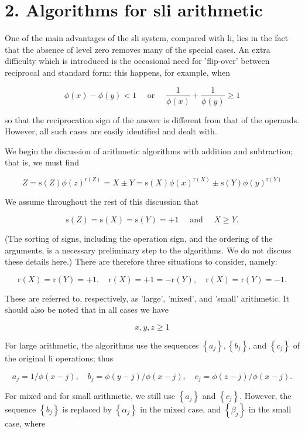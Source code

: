 \documentclass[10pt]{article}
\begin{document}
\section*{2. Algorithms for sli arithmetic}
One of the main advantages of the sli system, compared with li, lies in the fact that the absence of level zero removes many of the special cases. An extra difficulty which is introduced is the occasional need for 'flip-over' between reciprocal and standard form: this happens, for example, when

$$
\phi(x)-\phi(y)<1 \quad \text { or } \quad \frac{1}{\phi(x)}+\frac{1}{\phi(y)} \geqslant 1
$$

so that the reciprocation sign of the answer is different from that of the operands. However, all such cases are easily identified and dealt with.

We begin the discussion of arithmetic algorithms with addition and subtraction; that is, we must find

$$
Z=\mathrm{s}(Z) \phi(z)^{\mathrm{r}(Z)}=X \pm Y=\mathrm{s}(X) \phi(x)^{\mathrm{r}(X)} \pm \mathrm{s}(Y) \phi(y)^{\mathrm{r}(Y)}
$$

We assume throughout the rest of this discussion that

$$
\mathrm{s}(Z)=\mathrm{s}(X)=\mathrm{s}(Y)=+1 \quad \text { and } \quad X \geqslant Y .
$$

(The sorting of signs, including the operation sign, and the ordering of the arguments, is a necessary preliminary step to the algorithms. We do not discuss these details here.) There are therefore three situations to consider, namely:

$$
\mathrm{r}(X)=\mathrm{r}(Y)=+1, \quad \mathrm{r}(X)=+1=-\mathrm{r}(Y), \quad \mathrm{r}(X)=\mathrm{r}(Y)=-1 .
$$

These are referred to, respectively, as 'large', 'mixed', and 'small' arithmetic. It should also be noted that in all cases we have

$$
x, y, z \geqslant 1
$$

For large arithmetic, the algorithms use the sequences $\left\{a_{j}\right\},\left\{b_{j}\right\}$, and $\left\{c_{j}\right\}$ of the original li operations; thus

$$
a_{j}=1 / \phi(x-j), \quad b_{j}=\phi(y-j) / \phi(x-j), \quad c_{j}=\phi(z-j) / \phi(x-j) .
$$

For mixed and for small arithmetic, we still use $\left\{a_{j}\right\}$ and $\left\{c_{j}\right\}$. However, the sequence $\left\{b_{j}\right\}$ is replaced by $\left\{\alpha_{j}\right\}$ in the mixed case, and $\left\{\beta_{j}\right\}$ in the small case, where
\end{document}
